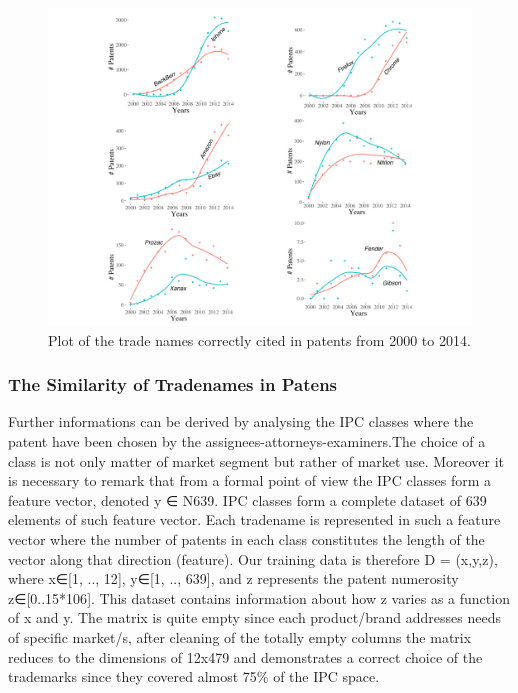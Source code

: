 \documentclass[]{book}
\begin{document}
\begin{figure}

{\centering \includegraphics[width=0.8\linewidth]{_bookdown_files/figures/Marks_Years} 

}

\caption{Plot of the trade names correctly cited in patents from 2000 to 2014.}\label{fig:populartm}
\end{figure}

\subsubsection*{The Similarity of Tradenames in
Patens}\label{the-similarity-of-tradenames-in-patens}

Further informations can be derived by analysing the IPC classes where
the patent have been chosen by the assignees-attorneys-examiners.The
choice of a class is not only matter of market segment but rather of
market use. Moreover it is necessary to remark that from a formal point
of view the IPC classes form a feature vector, denoted y ∈ N639. IPC
classes form a complete dataset of 639 elements of such feature vector.
Each tradename is represented in such a feature vector where the number
of patents in each class constitutes the length of the vector along that
direction (feature). Our training data is therefore D = (x,y,z), where
x∈{[}1, .., 12{]}, y∈{[}1, .., 639{]}, and z represents the patent
numerosity z∈{[}0..15*106{]}. This dataset contains information about
how z varies as a function of x and y. The matrix is quite empty since
each product/brand addresses needs of specific market/s, after cleaning
of the totally empty columns the matrix reduces to the dimensions of
12x479 and demonstrates a correct choice of the trademarks since they
covered almost 75\% of the IPC space.
\end{document}

